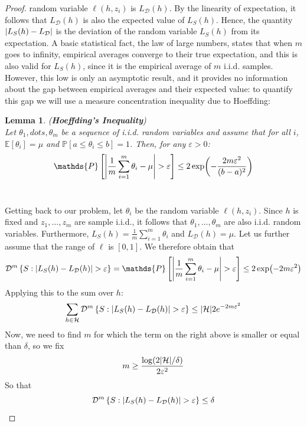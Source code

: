 \documentclass[12pt]{report}
\theoremstyle{plain}
\newtheorem{lemma}{Lemma}[chapter]
\newcommand\mcl[1]{\mathcal{#1}}
\begin{document}
\begin{flushleft}
\begin{proof}
	 random variable $\ell(h,z_i)$ is $L_\mcl{D}(h)$. By the linearity of 
	 expectation, it follows that $L_\mcl{D}(h)$ is also the expected value of 
	 $L_S(h)$. Hence, the quantity $\abs{L_S(h)-L_\mcl{D}}$ is the deviation of 
	 the random variable $L_S(h)$ from its expectation. A basic statistical 
	 fact, the law of large numbers, states that when $m$ goes to infinity, 
	 empirical averages converge to their true expectation, and this is also 
	 valid for $L_S(h)$, since it is the empirical average of $m$ i.i.d. 
	 samples.\\
	 However, this low is only an asymptotic result, and it provides no 
	 information about the gap between empirical averages and their expected 
	 value: to quantify this gap we will use a measure concentration inequality 
	 due to Hoeffding:
	 \begin{lemma}
	 	(\textbf{Hoeffding's Inequality})\\
	 	Let $\theta_1,dots,\theta_m$ be a sequence of i.i.d. random variables 
	 	and assume that for all $i$, $\mathds{E}[\theta_i]=\mu$ and 
	 	$\mathds{P}[a\leq\theta_i\leq b]=1$. Then, for any $\varepsilon>0$:
	 	\[ \mathds{P}\left[\abs{\frac{1}{m}\sum_{i=1}^m 
	 	\theta_i-\mu}>\varepsilon\right]\leq 
	 	2\exp(-\frac{2m\varepsilon^2}{(b-a)^2}) \]\\
	 	\label{lem:Hoeffding}
	 \end{lemma}
 Getting back to our problem, let $\theta_i$ be the random variable 
 $\ell(h,z_i)$. Since $h$ is fixed and $z_1,\dots,z_m$ are sample i.i.d., it 
 follows that $\theta_1,\dots,\theta_m$ are also i.i.d. random variables. 
 Furthermore, $L_S(h)=\frac{1}{m}\sum_{i=1}^m\theta_i$ and $L_\mcl{D}(h)=\mu$. 
 Let us further assume that the range of $\ell$ is $[0,1]$. We therefore obtain 
 that
 \[ \mcl{D}^m\left\{S:\abs{L_S(h)-L_\mcl{D}(h)} > \varepsilon \right\} = 
 \mathds{P}\left[\abs{\frac{1}{m}\sum_{i=1}^m \theta_i-\mu}>\varepsilon\right] 
 \leq 2\exp(-2m\varepsilon^2) \]
 Applying this to the sum over $h$:
 \[ \sum_{h\in\mcl{H}}\mcl{D}^m\left\{S:\abs{L_S(h)-L_\mcl{D}(h)} > \varepsilon 
 \right\} \leq\abs{\mcl{H}}2e^{-2m\varepsilon^2} \]
 Now, we need to find $m$ for which the term on the right above is smaller or 
 equal than $\delta$, so we fix
 \[ m\geq \frac{\log(2\abs{\mcl{H}}/\delta)}{2\varepsilon^2} \]
 So that
 \[ \mcl{D}^m\left\{S:\abs{L_S(h)-L_\mcl{D}(h)} > \varepsilon \right\} 
 \leq\delta \]
\end{proof}


\end{flushleft}
\end{document}
